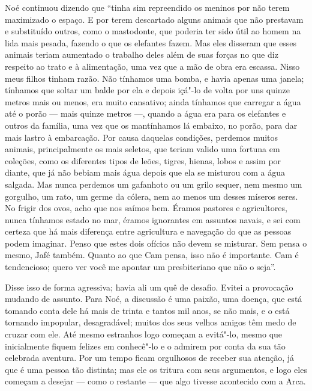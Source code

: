 Noé continuou dizendo que “tinha sim repreendido os meninos por não terem
maximizado o espaço. E por terem descartado alguns animais que não
prestavam e substituído outros, como o mastodonte, que poderia ter sido útil ao
homem na lida mais pesada, fazendo o que os elefantes fazem. Mas eles disseram que
esses animais teriam aumentado o trabalho deles além de suas forças no que diz
respeito ao trato e à alimentação, uma vez que a mão de obra era escassa.
Nisso meus filhos tinham razão. Não tínhamos uma bomba, e havia apenas uma janela;
tínhamos que soltar um balde por ela e depois içá"-lo de volta por uns quinze metros
mais ou menos, era muito cansativo; ainda tínhamos que carregar a
água até o porão --- mais quinze metros ---, quando a água era para os elefantes e
outros da família, uma vez que os mantínhamos lá embaixo, no porão, para dar mais
lastro à embarcação. Por causa daquelas condições, perdemos muitos animais,
principalmente os mais seletos, que teriam valido uma fortuna em coleções, como os
diferentes tipos de leões, tigres, hienas, lobos e assim por diante, que já não
bebiam mais água depois que ela se misturou com a água salgada. Mas nunca
perdemos um gafanhoto ou um grilo sequer, nem mesmo um gorgulho, um rato, um germe
da cólera, nem ao menos um desses míseros seres. No frigir dos ovos, acho que nos
saímos bem. Éramos pastores e agricultores, nunca tínhamos estado no mar,
éramos ignorantes em assuntos navais, e sei com certeza que há mais
diferença entre agricultura e navegação do que as pessoas podem imaginar. Penso que
estes dois ofícios não devem se misturar. Sem pensa o mesmo, Jafé
também. Quanto ao que Cam pensa, isso não é importante. Cam é tendencioso; 
quero ver você me apontar um presbiteriano que não o seja”.     

Disse isso de forma agressiva; havia ali um quê de desafio. Evitei a
provocação mudando de assunto. Para Noé, a discussão é uma paixão, uma doença, que
está tomando conta dele há mais de trinta e tantos mil anos, se não mais, e o está
tornando impopular, desagradável; muitos dos seus velhos amigos têm medo de
cruzar com ele. Até mesmo estranhos logo começam a evitá"-lo, mesmo que
inicialmente fiquem felizes em conhecê"-lo e o admirem por conta da sua tão
celebrada aventura. Por um tempo ficam orgulhosos de receber sua atenção, já que
é uma pessoa tão distinta; mas ele os tritura com seus argumentos, e logo eles começam
a desejar --- como o restante --- que algo tivesse acontecido com a Arca.

\sectionitem

